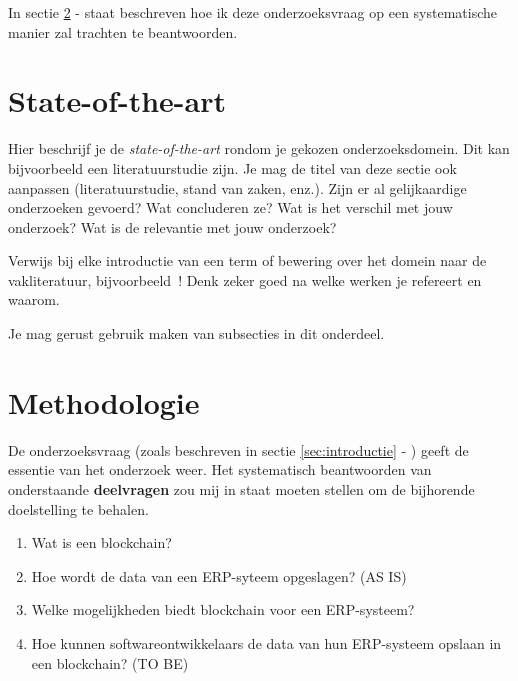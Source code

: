 In sectie \ref{sec:methodologie} -  staat beschreven hoe ik deze onderzoeksvraag op een systematische manier zal trachten te beantwoorden.





\section{State-of-the-art}
\label{sec:state-of-the-art}

Hier beschrijf je de \emph{state-of-the-art} rondom je gekozen onderzoeksdomein. Dit kan bijvoorbeeld een literatuurstudie zijn. Je mag de titel van deze sectie ook aanpassen (literatuurstudie, stand van zaken, enz.). Zijn er al gelijkaardige onderzoeken gevoerd? Wat concluderen ze? Wat is het verschil met jouw onderzoek? Wat is de relevantie met jouw onderzoek?

Verwijs bij elke introductie van een term of bewering over het domein naar de vakliteratuur, bijvoorbeeld~\autocite{Doll1954}! Denk zeker goed na welke werken je refereert en waarom.


Je mag gerust gebruik maken van subsecties in dit onderdeel.

\section{Methodologie}
\label{sec:methodologie}

De onderzoeksvraag (zoals beschreven in sectie \ref{sec:introductie} - ) geeft de essentie van het onderzoek weer. Het systematisch beantwoorden van onderstaande \textbf{deelvragen} zou mij in staat moeten stellen om de bijhorende doelstelling te behalen.

\begin{enumerate}
	\item Wat is een blockchain?
	\item Hoe wordt de data van een ERP-syteem opgeslagen? (AS IS)
	\item Welke mogelijkheden biedt blockchain voor een ERP-systeem?
	\item Hoe kunnen softwareontwikkelaars de data van hun ERP-systeem opslaan in een blockchain? (TO BE)
	
\end{enumerate}

